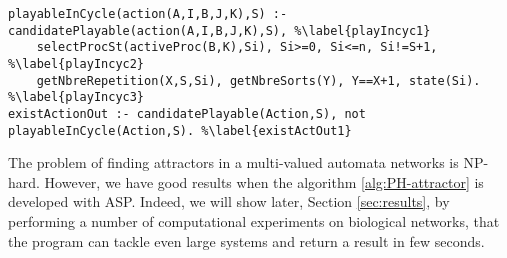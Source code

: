\begin{lstlisting}
playableInCycle(action(A,I,B,J,K),S) :- candidatePlayable(action(A,I,B,J,K),S), %\label{playIncyc1}
	selectProcSt(activeProc(B,K),Si), Si>=0, Si<=n, Si!=S+1, %\label{playIncyc2}
	getNbreRepetition(X,S,Si), getNbreSorts(Y), Y==X+1, state(Si). %\label{playIncyc3}
existActionOut :- candidatePlayable(Action,S), not playableInCycle(Action,S). %\label{existActOut1}
\end{lstlisting}

The problem of finding attractors in a multi-valued automata networks is NP-hard. However, we have good results when the algorithm \ref{alg:PH-attractor} is developed with ASP. Indeed, we will show later, Section \ref{sec:results}, by performing a number of computational experiments on biological networks, that the program can tackle even large systems and return a result in few seconds.

%
%
